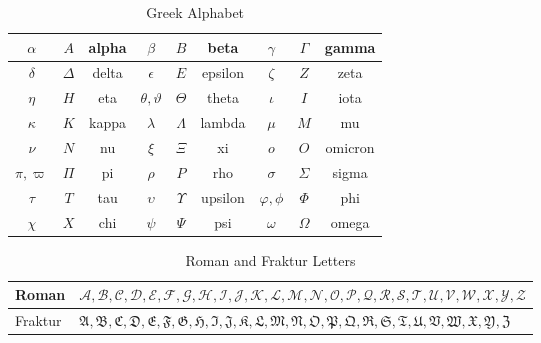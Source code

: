 \begin{table}[H]
\centering
\begin{tabular}{|c|c|c|c|c|c|c|c|c|}
\hline
$\alpha$ & $A$ & alpha   & $\beta$ & $B$ & beta   & $\gamma$ & $\Gamma$ & gamma \\ \hline
$\delta$ & $\Delta$ & delta   & $\epsilon$ & $E$ & epsilon & $\zeta$ & $Z$ & zeta \\ \hline
$\eta$   & $H$ & eta     & $\theta, \vartheta$ & $\Theta$ & theta & $\iota$ & $I$ & iota \\ \hline
$\kappa$ & $K$ & kappa   & $\lambda$ & $\Lambda$ & lambda & $\mu$ & $M$ & mu \\ \hline
$\nu$    & $N$ & nu      & $\xi$ & $\Xi$ & xi     & $o$ & $O$ & omicron \\ \hline
$\pi, \varpi$ & $\Pi$ & pi & $\rho$ & $P$ & rho   & $\sigma$ & $\Sigma$ & sigma \\ \hline
$\tau$   & $T$ & tau     & $\upsilon$ & $\Upsilon$ & upsilon & $\varphi, \phi$ & $\Phi$ & phi \\ \hline
$\chi$   & $X$ & chi     & $\psi$ & $\Psi$ & psi   & $\omega$ & $\Omega$ & omega \\ \hline
\end{tabular}
\caption{Greek Alphabet}
\label{tab:greekalphabet}
\end{table}

\begin{table}[H]
\centering
\begin{tabular}{|l|l|} \hline
Roman & $
\mathcal{A}, \mathcal{B}, \mathcal{C}, \mathcal{D}, \mathcal{E}, \mathcal{F}, 
\mathcal{G}, \mathcal{H}, \mathcal{I}, \mathcal{J}, \mathcal{K}, \mathcal{L}, 
\mathcal{M}, \mathcal{N}, \mathcal{O}, \mathcal{P}, \mathcal{Q}, \mathcal{R}, 
\mathcal{S}, \mathcal{T}, \mathcal{U}, \mathcal{V}, \mathcal{W}, \mathcal{X}, 
\mathcal{Y}, \mathcal{Z}
$ \\ \hline

Fraktur & $
\mathfrak{A}, \mathfrak{B}, \mathfrak{C}, \mathfrak{D}, \mathfrak{E}, \mathfrak{F}, 
\mathfrak{G}, \mathfrak{H}, \mathfrak{I}, \mathfrak{J}, \mathfrak{K}, \mathfrak{L}, 
\mathfrak{M}, \mathfrak{N}, \mathfrak{O}, \mathfrak{P}, \mathfrak{Q}, \mathfrak{R}, 
\mathfrak{S}, \mathfrak{T}, \mathfrak{U}, \mathfrak{V}, \mathfrak{W}, \mathfrak{X}, 
\mathfrak{Y}, \mathfrak{Z}
$ \\ \hline
\end{tabular}
\caption{Roman and Fraktur Letters}
\label{tab:roman_fraktur_letters}
\end{table}